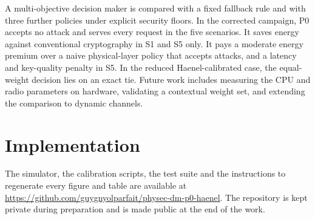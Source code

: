 \documentclass[conference]{IEEEtran}
\begin{document}
A multi-objective decision maker is compared with a fixed fallback rule and with three further policies under explicit security floors. In the corrected campaign, P0 accepts no attack and serves every request in the five scenarios. It saves energy against conventional cryptography in S1 and S5 only. It pays a moderate energy premium over a naive physical-layer policy that accepts attacks, and a latency and key-quality penalty in S5. In the reduced Haenel-calibrated case, the equal-weight decision lies on an exact tie. Future work includes measuring the CPU and radio parameters on hardware, validating a contextual weight set, and extending the comparison to dynamic channels.

\section{Implementation}

The simulator, the calibration scripts, the test suite and the instructions to regenerate every figure and table are available at \url{https://github.com/guygnyolparfait/physec-dm-p0-haenel}. The repository is kept private during preparation and is made public at the end of the work.
\end{document}
